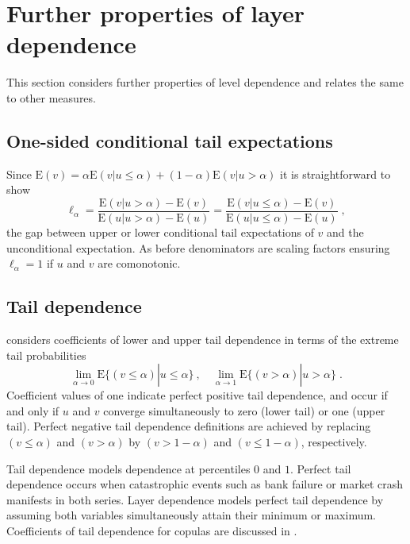 \documentclass[authoryear]{elsarticle}
\newcommand{\E}{{\mathrm E}}
\newcommand{\de}{\mathrm{d}}
\newcommand{\cq}{\ ,\quad }
\newcommand{\eref}[1]{(\ref{#1})}
\begin{document}
\section{Further properties of layer dependence}\label{sother}
This section considers further properties of level dependence and relates the same to other measures.

\subsection{One-sided conditional tail expectations}


Since $\E(v)=\alpha\E(v|u\leq \alpha)+(1-\alpha)\E(v|u>\alpha)$ it is straightforward to show
$$
\ell_\alpha = \frac{\E(v|u> \alpha)-\E(v)}{\E(u|u> \alpha)-\E(u)} = \frac{\E(v|u\leq \alpha)-\E(v)}{\E(u|u\leq \alpha)-\E(u)} \;,
$$
the gap between upper or lower conditional tail expectations of $v$ and the unconditional expectation. As before denominators are scaling factors ensuring $\ell_\alpha=1$ if $u$ and $v$ are comonotonic.

\subsection{Tail dependence}

 \cite{joe1997multivariate} considers coefficients of lower and upper tail dependence in terms of the extreme tail probabilities
 $$
\lim_{\alpha\rightarrow 0} \E\{(v\leq \alpha) |u\leq \alpha\} \cq
\lim_{\alpha\rightarrow 1} \E\{(v>\alpha )|u>\alpha\} \;.
$$
Coefficient values of one indicate perfect positive tail dependence, and occur if and only if $u$ and $v$ converge simultaneously to zero (lower tail) or one (upper tail). Perfect negative tail dependence definitions are achieved by replacing $(v\leq \alpha)$ and $(v>\alpha)$ by $(v>1-\alpha)$ and $(v\leq 1-\alpha)$, respectively.

Tail dependence models dependence at percentiles $0$ and $1$.
Perfect tail dependence occurs when catastrophic events such as  bank failure or  market crash manifests in both  series.  Layer dependence models perfect tail dependence by assuming both variables  simultaneously attain their minimum or maximum.  Coefficients of tail dependence for copulas are discussed in  \cite{joe1997multivariate}.
\end{document}
